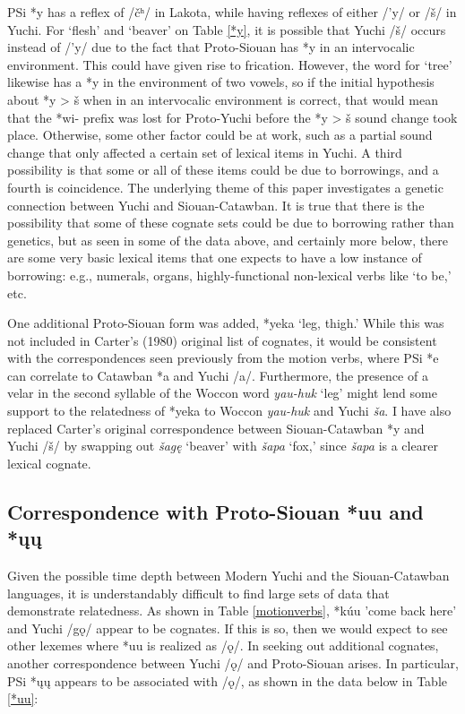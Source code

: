 \documentclass[output=paper]{LSP/langsci}
\begin{document}
PSi *y has a reflex of /\v{c}ʰ/ in Lakota, while having reflexes of either /'y/ or /\v{s}/ in Yuchi. For `flesh' and `beaver' on Table \ref{*y}, it is possible that Yuchi /\v{s}/ occurs instead of /'y/ due to the fact that Proto-Siouan has *y in an intervocalic environment. This could have given rise to frication. However, the word for `tree' likewise has a *y in the environment of two vowels, so if the initial hypothesis about *y > \v{s} when in an intervocalic environment is correct, that would mean that the *wi- prefix was lost for Proto-Yuchi before the *y > \v{s} sound change took place. Otherwise, some other factor could be at work, such as a partial sound change that only affected a certain set of lexical items in Yuchi. A third possibility is that some or all of these items could be due to borrowings, and a fourth is coincidence. The underlying theme of this paper investigates a genetic connection between Yuchi and Siouan-Catawban. It is true that there is the possibility that some of these cognate sets could be due to borrowing rather than genetics, but as seen in some of the data above, and certainly more below, there are some very basic lexical items that one expects to have a low instance of borrowing: e.g., numerals, organs, highly-functional non-lexical verbs like `to be,' etc. 

One additional Proto-Siouan form was added, *yeka `leg, thigh.' While this was not included in Carter's (1980) original list of cognates, it would be consistent with the correspondences seen previously from the motion verbs, where PSi *e can correlate to Catawban *a and Yuchi /a/. Furthermore, the presence of a velar in the second syllable of the Woccon word \emph{yau-huk} `leg' might lend some support to the relatedness of *yeka to Woccon \emph{yau-huk} and Yuchi \emph{\v{s}a}. I have also replaced Carter's original correspondence between Siouan-Catawban *y and Yuchi /\v{s}/ by swapping out \emph{\v{s}ag\k{e}} `beaver' with \emph{\v{s}apa} `fox,' since \emph{\v{s}apa} is a clearer lexical cognate.

\subsection{Correspondence with Proto-Siouan *uu and *\k{u}\k{u}}

Given the possible time depth between Modern Yuchi and the Siouan-Catawban languages, it is understandably difficult to find large sets of data that demonstrate relatedness. As shown in Table \ref{motionverbs}, *k\'uu 'come back here' and Yuchi /g\k{o}/ appear to be cognates. If this is so, then we would expect to see other lexemes where *uu is realized as /\k{o}/. In seeking out additional cognates, another correspondence between Yuchi /\k{o}/ and Proto-Siouan arises. In particular, PSi *\k{u}\k{u} appears to be associated with /\k{o}/, as shown in the data below in Table \ref{*uu}:
\end{document}
